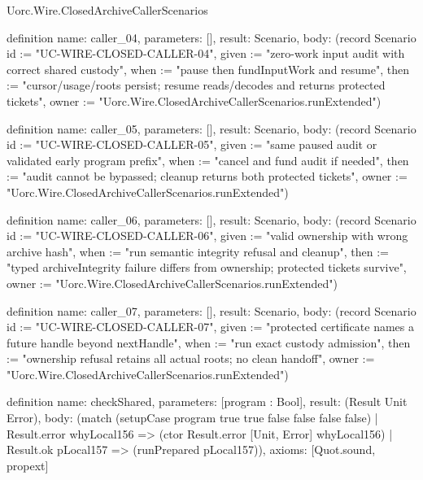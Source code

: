 \begin{lexlean}{Uorc.Wire.ClosedArchiveCallerScenarios}
\begin{semanticmodule}
definition{
  name: caller_04,
  parameters: [],
  result: Scenario,
  body: (record Scenario {id := "UC-WIRE-CLOSED-CALLER-04", given := "zero-work input audit with correct shared custody", when := "pause then fundInputWork and resume", then := "cursor/usage/roots persist; resume reads/decodes and returns protected tickets", owner := "Uorc.Wire.ClosedArchiveCallerScenarios.runExtended"})
}

definition{
  name: caller_05,
  parameters: [],
  result: Scenario,
  body: (record Scenario {id := "UC-WIRE-CLOSED-CALLER-05", given := "same paused audit or validated early program prefix", when := "cancel and fund audit if needed", then := "audit cannot be bypassed; cleanup returns both protected tickets", owner := "Uorc.Wire.ClosedArchiveCallerScenarios.runExtended"})
}

definition{
  name: caller_06,
  parameters: [],
  result: Scenario,
  body: (record Scenario {id := "UC-WIRE-CLOSED-CALLER-06", given := "valid ownership with wrong archive hash", when := "run semantic integrity refusal and cleanup", then := "typed archiveIntegrity failure differs from ownership; protected tickets survive", owner := "Uorc.Wire.ClosedArchiveCallerScenarios.runExtended"})
}

definition{
  name: caller_07,
  parameters: [],
  result: Scenario,
  body: (record Scenario {id := "UC-WIRE-CLOSED-CALLER-07", given := "protected certificate names a future handle beyond nextHandle", when := "run exact custody admission", then := "ownership refusal retains all actual roots; no clean handoff", owner := "Uorc.Wire.ClosedArchiveCallerScenarios.runExtended"})
}

definition{
  name: checkShared,
  parameters: [program : Bool],
  result: (Result Unit Error),
  body: (match (setupCase program true true false false false false)
    | Result.error whyLocal156 => (ctor Result.error [Unit, Error] whyLocal156)
    | Result.ok pLocal157 => (runPrepared pLocal157)),
  axioms: [Quot.sound, propext]
}


\end{semanticmodule}
\end{lexlean}
